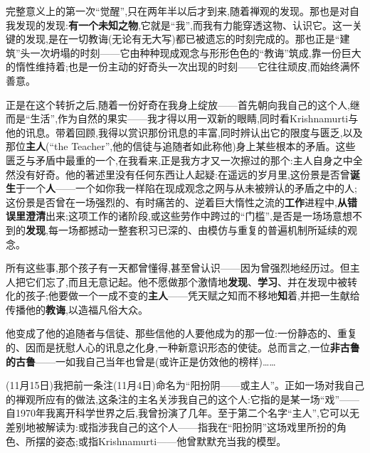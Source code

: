 完整意义上的第一次“觉醒”,只在两年半以后才到来,随着禅观的发现。那也是对自我发现的发现:\textbf{有一个未知之物},它就是“我”,而我有力能穿透这物、认识它。这一关键的发现,是在一切教诲(无论有无大写)都已被遗忘的时刻完成的。那也正是“建筑”头一次坍塌的时刻——它由种种现成观念与形形色色的“教诲”筑成,靠一份巨大的惰性维持着;也是一份主动的好奇头一次出现的时刻——它往往顽皮,而始终满怀善意。

正是在这个转折之后,随着一份好奇在我身上绽放——首先朝向我自己的这个人,继而是“生活”,作为自然的果实——我才得以用一双新的眼睛,同时看Krishnamurti与他的讯息。带着回顾,我得以赏识那份讯息的丰富,同时辨认出它的限度与匮乏,以及那位\textbf{主人}(“the Teacher”,他的信徒与追随者如此称他)身上某些根本的矛盾。这些匮乏与矛盾中最重的一个,在我看来,正是我方才又一次擦过的那个:主人自身之中全然没有好奇。他的著述里没有任何东西让人起疑:在遥远的岁月里,这份景是否曾\textbf{诞生}于一个\textbf{人}——一个如你我一样陷在现成观念之网与从未被辨认的矛盾之中的人;这份景是否曾在一场强烈的、有时痛苦的、逆着巨大惰性之流的\textbf{工作}进程中,\textbf{从错误里澄清}出来;这项工作的诸阶段,或这些劳作中跨过的“门槛”,是否是一场场意想不到的\textbf{发现},每一场都撼动一整套积习已深的、\dmark{}由模仿与重复的普遍机制所延续的观念。

所有这些事,那个孩子有一天都曾懂得,甚至曾认识——因为曾强烈地经历过。但主人把它们忘了,而且无意记起。他不愿做那个激情地\textbf{发现}、\textbf{学习}、并在发现中被转化的孩子;他要做一个一成不变的\textbf{主人}——凭天赋之知而不移地\textbf{知}着,并把一生献给传播他的\textbf{教诲},以造福凡俗大众。

他变成了他的追随者与信徒、那些信他的人要他成为的那一位:一份静态的、重复的、因而是抚慰人心的讯息之化身,一种新意识形态的使徒。总而言之,一位\textbf{非古鲁的古鲁}——一如我自己当年也曾是(或许正是仿效他的榜样)……

(11月15日)我把前一条注(11月4日)命名为“阳扮阴——或主人”。正如一场对我自己的禅观所应有的做法,这条注的主名关涉我自己的这个人:它指的是某一场“戏”——自1970年我离开科学世界之后,我曾扮演了几年。至于第二个名字“主人”,它可以无差别地被解读为:或指涉我自己的这个人——指我在“阳扮阴”这场戏里所扮的角色、所摆的姿态;或指Krishnamurti——他曾默默充当我的模型。

